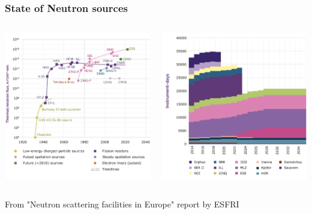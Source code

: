 \begin{frame}
  \frametitle{State of Neutron sources}
  \begin{columns}
    \begin{column}{0.50\textwidth}
      \includegraphics[width=\textwidth]{01_Neutron/fig/fig000_NeutronSources_a}
    \end{column}
    \begin{column}{0.50\textwidth}
      \includegraphics[width=\textwidth]{01_Neutron/fig/fig000_NeutronSources_b}
    \end{column}
  \end{columns}
  From "Neutron scattering facilities in Europe" report by ESFRI
\end{frame}

